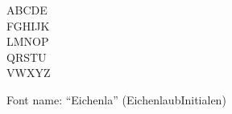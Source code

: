 \documentclass[a4paper]{article}
\begin{document}
\begin{center}
\fontsize{60pt}{72pt}
  ABCDE \\
  FGHIJK \\
  LMNOP \\
  QRSTU \\
  VWXYZ \\
\end{center}
\vfill
\begin{center}
Font name: ``Eichenla'' (EichenlaubInitialen)
\end{center}
\end{document}
